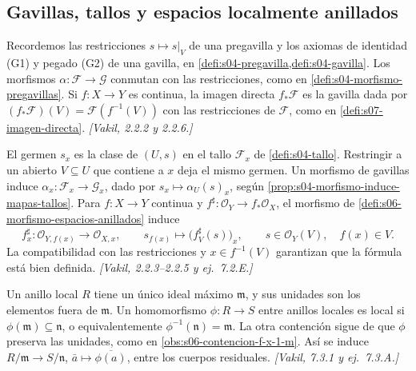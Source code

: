 \subsection{Gavillas, tallos y espacios localmente anillados}

\begin{defi}
\label{defi:s10-gavillas-imagen-directa}
Recordemos las restricciones \(s\mapsto s|_V\) de una pregavilla y los axiomas de identidad (G1) y pegado (G2) de una gavilla, en \cref{defi:s04-pregavilla,defi:s04-gavilla}. Los morfismos \(\alpha\colon\mathcal F\to\mathcal G\) conmutan con las restricciones, como en \cref{defi:s04-morfismo-pregavillas}. Si \(f\colon X\to Y\) es continua, la imagen directa \(f_*\mathcal F\) es la gavilla dada por \((f_*\mathcal F)(V)=\mathcal F(f^{-1}(V))\) con las restricciones de \(\mathcal F\), como en \cref{defi:s07-imagen-directa}. \emph{[Vakil, 2.2.2 y 2.2.6.]}
\end{defi}

\begin{defi}
\label{defi:s10-germen-tallo-morfismo}
El germen \(s_x\) es la clase de \((U,s)\) en el tallo \(\mathcal F_x\) de \cref{defi:s04-tallo}. Restringir a un abierto \(V\subseteq U\) que contiene a \(x\) deja el mismo germen. Un morfismo de gavillas induce \(\alpha_x\colon\mathcal F_x\to\mathcal G_x\), dado por \(s_x\mapsto\alpha_U(s)_x\), según \cref{prop:s04-morfismo-induce-mapas-tallos}. Para \(f\colon X\to Y\) continua y \(f^\sharp\colon\mathcal O_Y\to f_*\mathcal O_X\), el morfismo de \cref{defi:s06-morfismo-espacios-anillados} induce
\[
 f_x^\sharp\colon\mathcal O_{Y,f(x)}\longrightarrow\mathcal O_{X,x},
 \qquad s_{f(x)}\longmapsto\bigl(f_V^\sharp(s)\bigr)_x,
 \qquad s\in\mathcal O_Y(V),\quad f(x)\in V.
\]
La compatibilidad con las restricciones y \(x\in f^{-1}(V)\) garantizan que la fórmula está bien definida. \emph{[Vakil, 2.2.3--2.2.5 y ej.~7.2.E.]}
\end{defi}

\begin{defi}
\label{defi:s10-local-residual}
Un anillo local \(R\) tiene un único ideal máximo \(\mathfrak m\), y sus unidades son los elementos fuera de \(\mathfrak m\). Un homomorfismo \(\phi\colon R\to S\) entre anillos locales es local si \(\phi(\mathfrak m)\subseteq\mathfrak n\), o equivalentemente \(\phi^{-1}(\mathfrak n)=\mathfrak m\). La otra contención sigue de que \(\phi\) preserva las unidades, como en \cref{obs:s06-contencion-f-x-1-m}. Así se induce \(R/\mathfrak m\to S/\mathfrak n\), \(\bar a\mapsto\overline{\phi(a)}\), entre los cuerpos residuales. \emph{[Vakil, 7.3.1 y ej.~7.3.A.]}
\end{defi}

